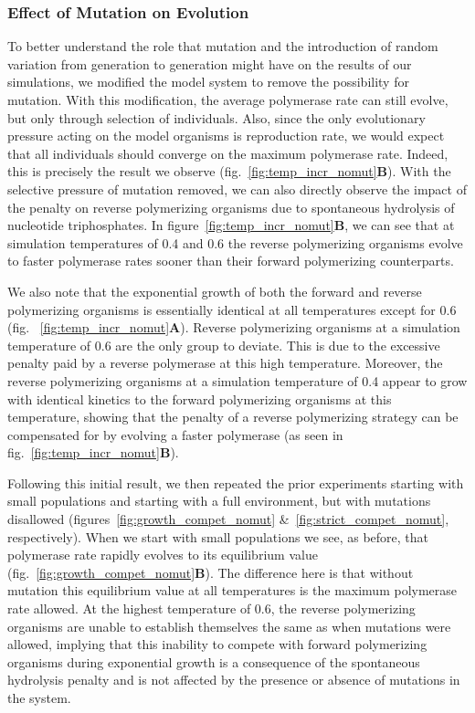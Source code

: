 \subsubsection*{Effect of Mutation on Evolution}
To better understand the role that mutation and the introduction of random variation from generation to generation might have on the results of our simulations, we modified the model system to remove the possibility for mutation. With this modification, the average polymerase rate can still evolve, but only through selection of individuals. Also, since the only evolutionary pressure acting on the model organisms is reproduction rate, we would expect that all individuals should converge on the maximum polymerase rate. Indeed, this is precisely the result we observe (fig.~\ref{fig:temp_incr_nomut}\textbf{B}). With the selective pressure of mutation removed, we can also directly observe the impact of the penalty on reverse polymerizing organisms due to spontaneous hydrolysis of nucleotide triphosphates. In figure~\ref{fig:temp_incr_nomut}\textbf{B}, we can see that at simulation temperatures of 0.4 and 0.6 the reverse polymerizing organisms evolve to faster polymerase rates sooner than their forward polymerizing counterparts.

We also note that the exponential growth of both the forward and reverse polymerizing organisms is essentially identical at all temperatures except for 0.6 (fig. ~\ref{fig:temp_incr_nomut}\textbf{A}). Reverse polymerizing organisms at a simulation temperature of 0.6 are the only group to deviate. This is due to the excessive penalty paid by a reverse polymerase at this high temperature. Moreover, the reverse polymerizing organisms at a simulation temperature of 0.4 appear to grow with identical kinetics to the forward polymerizing organisms at this temperature, showing that the penalty of a reverse polymerizing strategy can be compensated for by evolving a faster polymerase (as seen in fig.~\ref{fig:temp_incr_nomut}\textbf{B}).

Following this initial result, we then repeated the prior experiments starting with small populations and starting with a full environment, but with mutations disallowed (figures~\ref{fig:growth_compet_nomut} \&~\ref{fig:strict_compet_nomut}, respectively). When we start with small populations we see, as before, that polymerase rate rapidly evolves to its equilibrium value (fig.~\ref{fig:growth_compet_nomut}\textbf{B}). The difference here is that without mutation this equilibrium value at all temperatures is the maximum polymerase rate allowed. At the highest temperature of 0.6, the reverse polymerizing organisms are unable to establish themselves the same as when mutations were allowed, implying that this inability to compete with forward polymerizing organisms during exponential growth is a consequence of the spontaneous hydrolysis penalty and is not affected by the presence or absence of mutations in the system.

